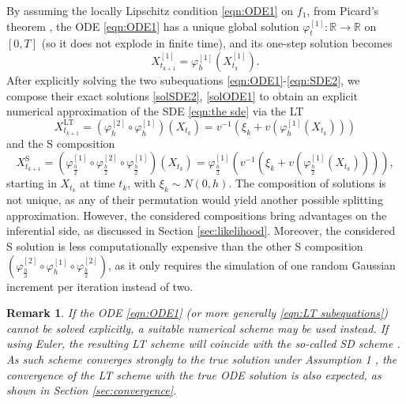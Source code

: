 \documentclass[a4paper,12pt]{article}
\numberwithin{equation}{section}
\theoremstyle{plain}
\newtheorem{remark}{Remark}
\theoremstyle{definition}
\begin{document}
By assuming the locally Lipschitz condition \eqref{eqn:ODE1} on $f_1$, from Picard's theorem \cite{sideris_ordinary_2013}, the ODE \eqref{eqn:ODE1} has a unique global solution $\varphi_t^{[1]}:\mathbb{R}\to\mathbb{R}$ on $[0,T]$ (so it does not explode in finite time), and its one-step solution becomes
\begin{equation}\label{solODE1}
X^{[1]}_{t_{k+1}}=\varphi_h^{[1]}(X^{[1]}_{t_k}).
\end{equation}
After explicitly solving the two subequations \eqref{eqn:ODE1}-\eqref{eqn:SDE2}, we  compose their exact solutions \eqref{solSDE2}, \eqref{solODE1} to obtain an explicit numerical approximation of the SDE \eqref{eqn:the sde} via the LT    \cite{trotter_product_1959} 
\begin{equation}\label{eqn:LT subsystem}
X^{\text{LT}}_{t_{k+1}}=\left(\varphi_h^{[2]}\circ\varphi_h^{[1]}\right)(X_{t_k})=v^{-1}
    \left(\xi_k+v(\varphi^{[1]}_{h}(X_{t_k}))\right)
\end{equation}
and the S composition \cite{strang_construction_1968}
\begin{equation}\label{eqn:Strang subsystem}
        X^{\text{S}}_{t_{k+1}}=\left(\varphi^{[1]}_{\frac{h}{2}}\circ \varphi_{\frac{h}{2}}^{[2]}\circ \varphi_{\frac{h}{2}}^{[1]}\right)(X_{t_k})=
\varphi^{[1]}_{\frac{h}{2}}\left(v^{-1}({\xi_k}+v(\varphi^{[1]}_{\frac{h}{2}}(X_{t_k})))\right),
    \end{equation}
    starting in $X_{t_k}$ at time $t_k$, with $\xi_k \sim N(0,h)$. 
The composition of  solutions is not unique, as any of their permutation would yield another possible splitting approximation. However, the considered compositions bring  advantages on the inferential side, as discussed in Section \ref{sec:likelihood}. Moreover, the considered S solution is less computationally expensive than the other S composition $(\varphi^{[2]}_{\frac{h}{2}}\circ\varphi^{[1]}_{h}\circ\varphi^{[2]}_{\frac{h}{2}})$, as it only requires the simulation of one random Gaussian increment per iteration instead of two.
\begin{remark}\label{semi-discrete}
If the ODE \eqref{eqn:ODE1} (or more generally \eqref{eqn:LT subequations}) cannot be solved explicitly, a suitable numerical scheme may be used instead. If using  Euler, the resulting LT scheme will coincide with the so-called SD scheme \cite{halidias_semi-discrete_2012,stamatiou_boundary_2018}. As such scheme converges strongly to the true solution under Assumption 1 \cite{higham_strong_2002,stamatiou_boundary_2018}, the convergence of the LT scheme  with the true ODE solution is also expected, as shown in Section \ref{sec:convergence}.
\end{remark}
\end{document}
